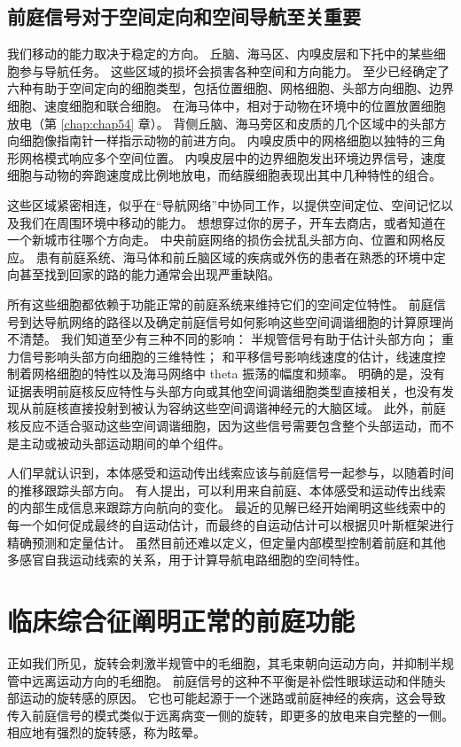 \subsection{前庭信号对于空间定向和空间导航至关重要}

我们移动的能力取决于稳定的方向。 丘脑、海马区、内嗅皮层和下托中的某些细胞参与导航任务。 这些区域的损坏会损害各种空间和方向能力。 至少已经确定了六种有助于空间定向的细胞类型，包括位置细胞、网格细胞、头部方向细胞、边界细胞、速度细胞和联合细胞。 在海马体中，相对于动物在环境中的位置放置细胞放电（第 \ref{chap:chap54} 章）。 背侧丘脑、海马旁区和皮质的几个区域中的头部方向细胞像指南针一样指示动物的前进方向。 内嗅皮质中的网格细胞以独特的三角形网格模式响应多个空间位置。 内嗅皮层中的边界细胞发出环境边界信号，速度细胞与动物的奔跑速度成比例地放电，而结膜细胞表现出其中几种特性的组合。

这些区域紧密相连，似乎在“导航网络”中协同工作，以提供空间定位、空间记忆以及我们在周围环境中移动的能力。 想想穿过你的房子，开车去商店，或者知道在一个新城市往哪个方向走。 中央前庭网络的损伤会扰乱头部方向、位置和网格反应。 患有前庭系统、海马体和前丘脑区域的疾病或外伤的患者在熟悉的环境中定向甚至找到回家的路的能力通常会出现严重缺陷。

所有这些细胞都依赖于功能正常的前庭系统来维持它们的空间定位特性。 前庭信号到达导航网络的路径以及确定前庭信号如何影响这些空间调谐细胞的计算原理尚不清楚。 我们知道至少有三种不同的影响： 半规管信号有助于估计头部方向； 重力信号影响头部方向细胞的三维特性； 和平移信号影响线速度的估计，线速度控制着网格细胞的特性以及海马网络中 theta 振荡的幅度和频率。 明确的是，没有证据表明前庭核反应特性与头部方向或其他空间调谐细胞类型直接相关，也没有发现从前庭核直接投射到被认为容纳这些空间调谐神经元的大脑区域。 此外，前庭核反应不适合驱动这些空间调谐细胞，因为这些信号需要包含整个头部运动，而不是主动或被动头部运动期间的单个组件。

人们早就认识到，本体感受和运动传出线索应该与前庭信号一起参与，以随着时间的推移跟踪头部方向。 有人提出，可以利用来自前庭、本体感受和运动传出线索的内部生成信息来跟踪方向航向的变化。 最近的见解已经开始阐明这些线索中的每一个如何促成最终的自运动估计，而最终的自运动估计可以根据贝叶斯框架进行精确预测和定量估计。 虽然目前还难以定义，但定量内部模型控制着前庭和其他多感官自我运动线索的关系，用于计算导航电路细胞的空间特性。




\section{临床综合征阐明正常的前庭功能}
正如我们所见，旋转会刺激半规管中的毛细胞，其毛束朝向运动方向，并抑制半规管中远离运动方向的毛细胞。 前庭信号的这种不平衡是补偿性眼球运动和伴随头部运动的旋转感的原因。 它也可能起源于一个迷路或前庭神经的疾病，这会导致传入前庭信号的模式类似于远离病变一侧的旋转，即更多的放电来自完整的一侧。 相应地有强烈的旋转感，称为眩晕。

